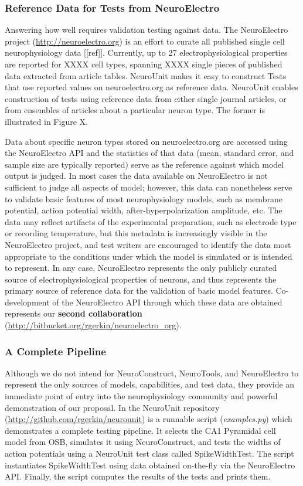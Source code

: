 \documentclass[11pt,letterpaper]{article}
\begin{document}
\subsubsection{Reference Data for Tests from NeuroElectro}
Answering how well requires validation testing against data. The NeuroElectro project (\url{http://neuroelectro.org}) is an effort to curate all published single cell neurophysiology data [[ref]].  Currently, up to 27 electrophysiological properties are reported for XXXX cell types, spanning XXXX single pieces of published data extracted from article tables.  NeuroUnit makes it easy to construct Tests that use reported values on neuroelectro.org as reference data.  NeuroUnit enables construction of tests using reference data from either single journal articles, or from ensembles of articles about a particular neuron type.  The former is illustrated in Figure X.  

Data about specific neuron types stored on neuroelectro.org are accessed using the NeuroElectro API and the statistics of that data (mean, standard error, and sample size are typically reported) serve as the reference against which model output is judged.  In most cases the data available on NeuroElectro is not sufficient to judge all aspects of model; however, this data can nonetheless serve to validate basic features of most neurophysiology models, such as membrane potential, action potential width, after-hyperpolarization amplitude, etc.  The data may reflect artifacts of the experimental preparation, such as electrode type or recording temperature, but this metadata is increasingly visible in the NeuroElectro project, and test writers are encouraged to identify the data most appropriate to the conditions under which the model is simulated or is intended to represent.  In any case, NeuroElectro represents the only publicly curated source of electrophysiological properties of neurons, and thus represents the primary source of reference data for the validation of basic model features.  Co-development of the NeuroElectro API through which these data are obtained represents our \textbf{second collaboration} (\url{http://bitbucket.org/rgerkin/neuroelectro_org}).  

\subsubsection{A Complete Pipeline}
Although we do not intend for NeuroConstruct, NeuroTools, and NeuroElectro to represent the only sources of models, capabilities, and test data, they provide an immediate point of entry into the neurophysiology community and powerful demonstration of our proposal.  In the NeuroUnit repository (\url{http://github.com/rgerkin/neurounit}) is a runnable script (\textit{examples.py}) which demonstrates a complete testing pipeline.  It selects the CA1 Pyramidal cell model from OSB, simulates it using NeuroConstruct, and tests the widths of action potentials using a NeuroUnit test class called SpikeWidthTest.  The script instantiates SpikeWidthTest using data obtained on-the-fly via the NeuroElectro API.  Finally, the script computes the results of the tests and prints them.    
\end{document}

